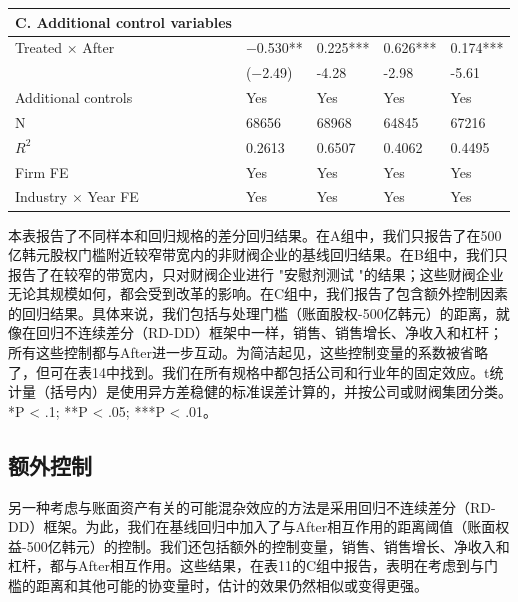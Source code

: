 \documentclass{article}
\begin{document}
\begin{table}[H]
\begin{tabularx}{\textwidth}{lXXXX}
C. Additional   control variables             &              &          &            &               \\ \midrule
Treated ×   After                             & −0.530**     & 0.225*** & 0.626***   & 0.174***      \\
                                              & (−2.49)      & -4.28    & -2.98      & -5.61         \\
Additional   controls                         & Yes          & Yes      & Yes        & Yes           \\
N                                             & 68656        & 68968    & 64845      & 67216         \\
$R^2$                                            & 0.2613       & 0.6507   & 0.4062     & 0.4495        \\
Firm FE                                       & Yes          & Yes      & Yes        & Yes           \\
Industry ×   Year FE                          & Yes          & Yes      & Yes        & Yes           \\ \bottomrule
\end{tabularx}
\begin{tablenotes}
\footnotesize
    \item 本表报告了不同样本和回归规格的差分回归结果。在A组中，我们只报告了在500亿韩元股权门槛附近较窄带宽内的非财阀企业的基线回归结果。在B组中，我们只报告了在较窄的带宽内，只对财阀企业进行 "安慰剂测试 "的结果；这些财阀企业无论其规模如何，都会受到改革的影响。在C组中，我们报告了包含额外控制因素的回归结果。具体来说，我们包括与处理门槛（账面股权-500亿韩元）的距离，就像在回归不连续差分（RD-DD）框架中一样，销售、销售增长、净收入和杠杆；所有这些控制都与After进一步互动。为简洁起见，这些控制变量的系数被省略了，但可在表14中找到。我们在所有规格中都包括公司和行业年的固定效应。t统计量（括号内）是使用异方差稳健的标准误差计算的，并按公司或财阀集团分类。*P < .1; **P < .05; ***P < .01。
\end{tablenotes}
\end{table}

\subsection{额外控制}
另一种考虑与账面资产有关的可能混杂效应的方法是采用回归不连续差分（RD-DD）框架。为此，我们在基线回归中加入了与After相互作用的距离阈值（账面权益-500亿韩元）的控制。我们还包括额外的控制变量，销售、销售增长、净收入和杠杆，都与After相互作用。这些结果，在表11的C组中报告，表明在考虑到与门槛的距离和其他可能的协变量时，估计的效果仍然相似或变得更强。
\end{document}
